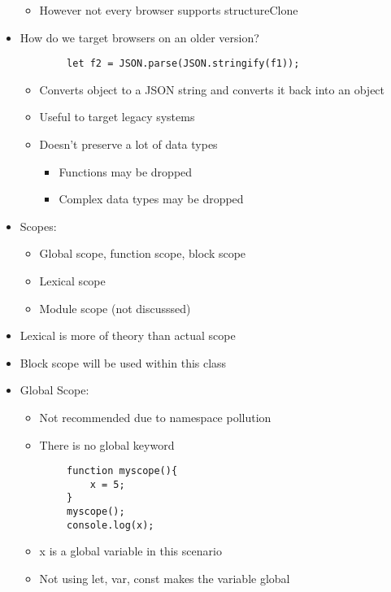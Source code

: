\documentclass{article}
\begin{document}
\begin{itemize}
\begin{itemize}
        \item However not every browser supports structureClone
    \end{itemize}
    \item How do we target browsers on an older version?
    \begin{lstlisting}
        let f2 = JSON.parse(JSON.stringify(f1));
    \end{lstlisting}
    \begin{itemize}
        \item Converts object to a JSON string and converts it back into an object
        \item Useful to target legacy systems
        \item Doesn't preserve a lot of data types
        \begin{itemize}
            \item Functions may be dropped
            \item Complex data types may be dropped
        \end{itemize}
    \end{itemize}
    \item Scopes:
    \begin{itemize}
        \item Global scope, function scope, block scope
        \item Lexical scope 
        \item Module scope (not discusssed)
    \end{itemize}
    \item Lexical is more of theory than actual scope
    \item Block scope will be used within this class
    \item Global Scope:
    \begin{itemize}
        \item Not recommended due to namespace pollution
        \item There is no global keyword
    \end{itemize}
    \begin{lstlisting}
        function myscope(){
            x = 5;
        }
        myscope();
        console.log(x);
    \end{lstlisting}
    \begin{itemize}
        \item x is a global variable in this scenario
        \item Not using let, var, const makes the variable global

\end{itemize}
\end{itemize}
\end{document}
